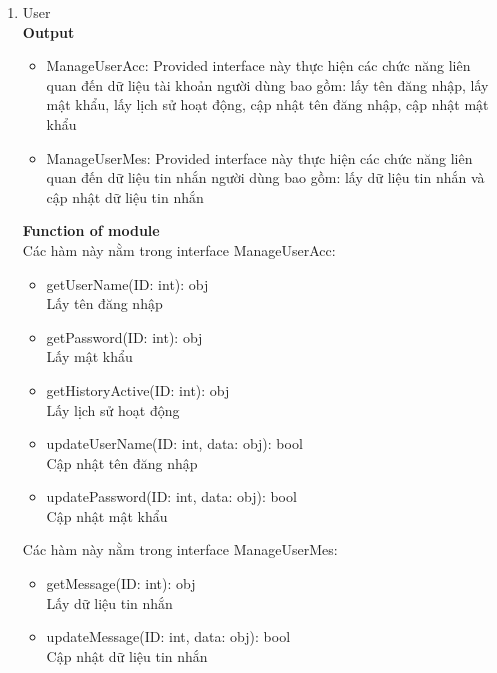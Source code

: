 \documentclass[a4paper]{article}
\begin{document}
\begin{enumerate}
 
               \item User
 \\
  \textbf{Output}
   \begin{itemize}
     \item ManageUserAcc: Provided interface này thực hiện  các chức năng liên quan đến dữ liệu tài
khoản người dùng bao gồm: lấy tên đăng nhập, lấy mật khẩu, lấy lịch sử hoạt động, cập nhật
tên đăng nhập, cập nhật mật khẩu
      \item ManageUserMes: Provided interface này thực hiện   các chức năng liên quan đến dữ liệu tin
nhắn người dùng bao gồm: lấy dữ liệu tin nhắn và cập nhật dữ liệu tin nhắn
 \end{itemize}
  \textbf{Function of module}\\
  Các hàm này nằm trong interface ManageUserAcc:
     \begin{itemize}
\item getUserName(ID: int): obj
\\ Lấy tên đăng nhập
\item getPassword(ID: int): obj
\\ Lấy mật khẩu
\item getHistoryActive(ID: int): obj
\\ Lấy lịch sử hoạt động
\item updateUserName(ID: int, data: obj): bool
\\ Cập nhật
tên đăng nhập
\item updatePassword(ID: int, data: obj): bool
\\ Cập nhật mật khẩu
 \end{itemize}
 
   Các hàm này nằm trong interface ManageUserMes:
     \begin{itemize}
\item getMessage(ID: int): obj
\\ Lấy dữ liệu tin nhắn
\item updateMessage(ID: int, data: obj): bool
\\  Cập nhật dữ liệu tin nhắn
 \end{itemize}
 
 
     \end{enumerate}
\end{document}
